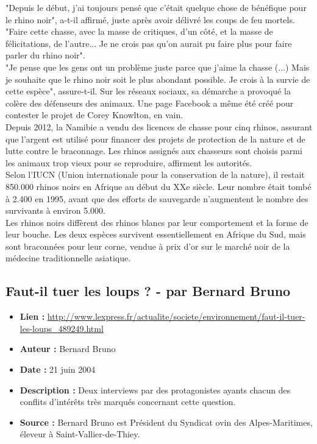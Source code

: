 \documentclass[8pt]{article}
\begin{document}
"Depuis le début, j'ai toujours pensé que c'était quelque chose de bénéfique pour le rhino noir", a-t-il affirmé, juste après avoir délivré les coups de feu mortels. "Faire cette chasse, avec la masse de critiques, d'un côté, et la masse de félicitations, de l'autre... Je ne crois pas qu'on aurait pu faire plus pour faire parler du rhino noir".  \\

"Je pense que les gens ont un problème juste parce que j'aime la chasse (...) Mais je souhaite que le rhino noir soit le plus abondant possible. Je crois à la survie de cette espèce", assure-t-il. Sur les réseaux sociaux, sa démarche a provoqué la colère des défenseurs des animaux. Une page Facebook a même été créé pour contester le projet de Corey Knowlton, en vain.   \\

Depuis 2012, la Namibie a vendu des licences de chasse pour cinq rhinos, assurant que l'argent est utilisé pour financer des projets de protection de la nature et de lutte contre le braconnage. Les rhinos assignés aux chasseurs sont choisis parmi les animaux trop vieux pour se reproduire, affirment les autorités.  \\

Selon l'IUCN (Union internationale pour la conservation de la nature), il restait 850.000 rhinos noirs en Afrique au début du XXe siècle. Leur nombre était tombé à 2.400 en 1995, avant que des efforts de sauvegarde n'augmentent le nombre des survivants à environ 5.000. \\

Les rhinos noirs diffèrent des rhinos blancs par leur comportement et la forme de leur bouche. Les deux espèces survivent essentiellement en Afrique du Sud, mais sont braconnées pour leur corne, vendue à prix d'or sur le marché noir de la médecine traditionnelle asiatique. \\
\newpage
\subsection{Faut-il tuer les loups ? - par Bernard Bruno}
\begin{itemize}
	\item \textbf{Lien : }  \url{http://www.lexpress.fr/actualite/societe/environnement/faut-il-tuer-les-loups_489249.html} 
	\item \textbf{Auteur : } Bernard Bruno
	\item \textbf{Date : } 21 juin 2004
	\item \textbf{Description : } Deux interviews par des protagonistes ayants chacun des conflits d'intérêts très marqués concernant cette question.
	\item \textbf{Source : } Bernard Bruno est Président du Syndicat ovin des Alpes-Maritimes, éleveur à Saint-Vallier-de-Thiey.
\end{itemize}
\end{document}

